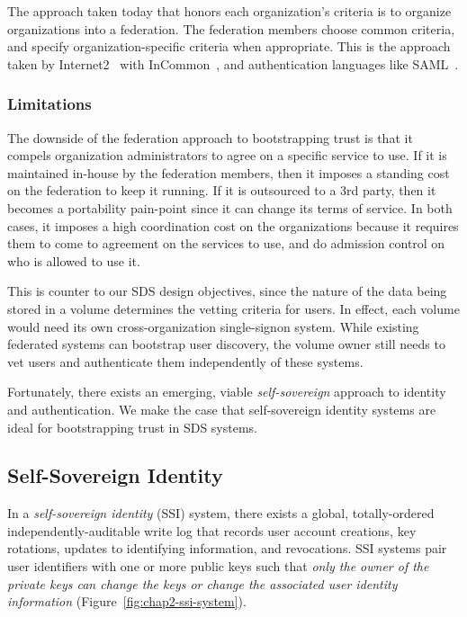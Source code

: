 The approach taken today that honors each organization's criteria is to organize
organizations into a federation.  The federation members choose common criteria,
and specify organization-specific criteria when appropriate.  This is the
approach taken by Internet2~\cite{internet2} with InCommon~\cite{incommon}, and
authentication languages like SAML~\cite{saml}.

\subsubsection{Limitations}

The downside of the federation approach to bootstrapping trust is that it compels organization
administrators to agree on a specific service to use.  If it is maintained in-house by the
federation members, then it imposes a standing cost on the federation to keep it
running.  If it is outsourced to a 3rd party, then it becomes a portability
pain-point since it can change its terms of service.  In both cases, it imposes
a high coordination cost on the organizations because it requires them to come
to agreement on the services to use, and do admission control on who is allowed
to use it.

This is counter to our SDS design objectives, since the nature of the data being stored
in a volume determines the vetting criteria for users.  In effect, each volume
would need its own cross-organization single-signon system.  While existing
federated systems can bootstrap user discovery, the volume owner still
needs to vet users and authenticate them independently of these systems.

Fortunately, there exists an emerging, viable \emph{self-sovereign} approach
to identity and authentication.  We make the case that self-sovereign identity
systems are ideal for bootstrapping trust in SDS systems.

\subsection{Self-Sovereign Identity}

In a \emph{self-sovereign identity} (SSI) system, there exists a global,
totally-ordered independently-auditable write log that records user account creations, key rotations,
updates to identifying information, and revocations.  SSI systems 
pair user identifiers with one or more public keys such that \emph{only the 
owner of the private keys can 
change the keys or change the associated user identity information}
(Figure~\ref{fig:chap2-ssi-system}).

